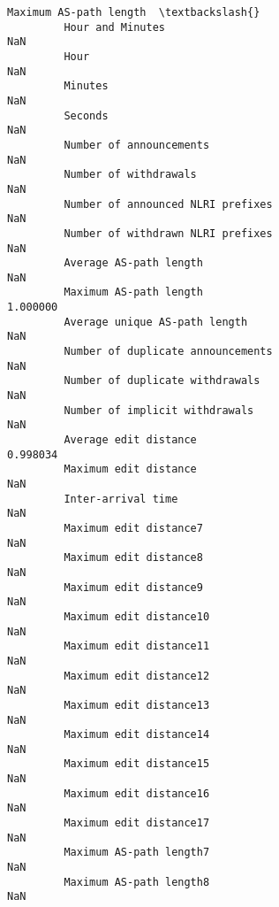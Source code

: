 \documentclass[11pt]{article}
\begin{document}
\begin{Verbatim}[commandchars=\\\{\}]
                                                            Maximum AS-path length  \textbackslash{}
         Hour and Minutes                                                      NaN   
         Hour                                                                  NaN   
         Minutes                                                               NaN   
         Seconds                                                               NaN   
         Number of announcements                                               NaN   
         Number of withdrawals                                                 NaN   
         Number of announced NLRI prefixes                                     NaN   
         Number of withdrawn NLRI prefixes                                     NaN   
         Average AS-path length                                                NaN   
         Maximum AS-path length                                           1.000000   
         Average unique AS-path length                                         NaN   
         Number of duplicate announcements                                     NaN   
         Number of duplicate withdrawals                                       NaN   
         Number of implicit withdrawals                                        NaN   
         Average edit distance                                            0.998034   
         Maximum edit distance                                                 NaN   
         Inter-arrival time                                                    NaN   
         Maximum edit distance7                                                NaN   
         Maximum edit distance8                                                NaN   
         Maximum edit distance9                                                NaN   
         Maximum edit distance10                                               NaN   
         Maximum edit distance11                                               NaN   
         Maximum edit distance12                                               NaN   
         Maximum edit distance13                                               NaN   
         Maximum edit distance14                                               NaN   
         Maximum edit distance15                                               NaN   
         Maximum edit distance16                                               NaN   
         Maximum edit distance17                                               NaN   
         Maximum AS-path length7                                               NaN   
         Maximum AS-path length8                                               NaN   

\end{Verbatim}
\end{document}
